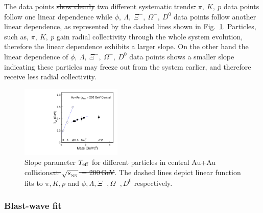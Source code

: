 \documentclass[%
 reprint,	
 amsmath,amssymb,
 aps,
 prc,
]{revtex4-1}
\providecommand{\DIFaddtex}[1]{{\protect\color{blue}\uwave{#1}}} %
\providecommand{\DIFdeltex}[1]{{\protect\color{red}\sout{#1}}}                      %
\providecommand{\DIFaddbegin}{} %
\providecommand{\DIFaddend}{} %
\providecommand{\DIFdelbegin}{} %
\providecommand{\DIFdelend}{} %
\providecommand{\DIFdelFL}[1]{\DIFdel{#1}} %
\providecommand{\DIFdelbeginFL}{} %
\providecommand{\DIFdelendFL}{} %
\providecommand{\DIFadd}[1]{\texorpdfstring{\DIFaddtex{#1}}{#1}} %
\providecommand{\DIFdel}[1]{\texorpdfstring{\DIFdeltex{#1}}{}} %
\begin{document}
The data points \DIFdelbegin \DIFdel{show clearly }\DIFdelend \DIFaddbegin \DIFadd{clearly show }\DIFaddend two different systematic trends\DIFdelbegin \DIFdel{: }\DIFdelend \DIFaddbegin \DIFadd{. }\DIFaddend $\pi,\ K,\ p$ data points follow one linear dependence while $\phi,\ \Lambda,\ \Xi^{-},\ \Omega^{-},\ D^0$ data points follow another linear dependence, as represented by the dashed lines shown in Fig.~\ref{fig:Teff_ALL}. Particles, such as, $\pi,\ K,\ p$ gain radial collectivity through the whole system evolution, therefore the linear dependence exhibits a larger slope. On the other hand the linear dependence of $\phi,\ \Lambda,\ \Xi^{-},\ \Omega^{-},\ D^0$ data points shows a smaller slope indicating these particles may freeze out from the system earlier, and therefore receive less radial collectivity.


\begin{figure}
\centering
\includegraphics[width=0.43\textwidth]{fig/Teff_ALL.pdf}
\caption{Slope parameter $T_{\rm eff}$ for different particles in central Au+Au collisions\DIFdelbeginFL \DIFdelFL{at $\sqrt{s_{_{\rm NN}}}$ = 200\,GeV}\DIFdelendFL . The dashed lines depict linear function fits to $\pi,K,p$ and $\phi,\Lambda,\Xi^{-},\Omega^{-},D^0$ respectively.}
\label{fig:Teff_ALL} 
\end{figure}


\subsubsection{\DIFdelbegin %
\DIFdelend Blast-wave fit}
\DIFaddbegin \label{result:collectivity:BW}
\DIFaddend 
\end{document}
